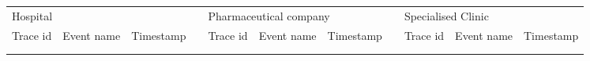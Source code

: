 \begin{table}[t]
\begin{tabular}{|lll|l|lll|l|lll|}
\cline{1-3} \cline{5-7} \cline{9-11}
\multicolumn{3}{|l|}{Hospital}                                               &  & \multicolumn{3}{l|}{Pharmaceutical company}                                 &  & \multicolumn{3}{l|}{Specialised Clinic}                                     \\ \cline{1-3} \cline{5-7} \cline{9-11} 
\multicolumn{1}{|l|}{Trace id} & \multicolumn{1}{l|}{Event name} & Timestamp &  & \multicolumn{1}{l|}{Trace id} & \multicolumn{1}{l|}{Event name} & Timestamp &  & \multicolumn{1}{l|}{Trace id} & \multicolumn{1}{l|}{Event name} & Timestamp \\ \cline{1-3} \cline{5-7} \cline{9-11} 
\multicolumn{1}{|l|}{}         & \multicolumn{1}{l|}{}           &           &  & \multicolumn{1}{l|}{}         & \multicolumn{1}{l|}{}           &           &  & \multicolumn{1}{l|}{}         & \multicolumn{1}{l|}{}           &           \\ \cline{1-3} \cline{5-7} \cline{9-11} 
\multicolumn{1}{|l|}{}         & \multicolumn{1}{l|}{}           &           &  & \multicolumn{1}{l|}{}         & \multicolumn{1}{l|}{}           &           &  & \multicolumn{1}{l|}{}         & \multicolumn{1}{l|}{}           &           \\ \cline{1-3} \cline{5-7} \cline{9-11} 
\end{tabular}
\end{table}

